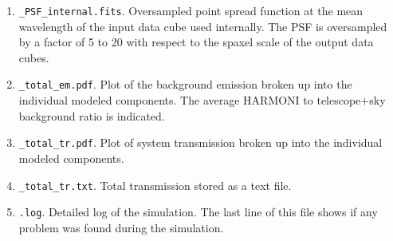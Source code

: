 \documentclass[12pt]{report}
\begin{document}
\begin{enumerate}
\item \texttt{\_PSF\_internal.fits}. Oversampled point spread function at the mean wavelength of the input data cube used internally. The PSF is oversampled by a factor of 5 to 20 with respect to the spaxel scale of the output data cubes.
\item \texttt{\_total\_em.pdf}. Plot of the background emission broken up into the individual modeled components. The average HARMONI to telescope$+$sky background ratio is indicated.
\item \texttt{\_total\_tr.pdf}. Plot of system transmission broken up into the individual modeled components.
\item \texttt{\_total\_tr.txt}. Total transmission stored as a text file.
\item \texttt{.log}. Detailed log of the simulation. The last line of this file shows if any problem was found during the simulation.
\end{enumerate}


% 
% 
% 
% 
% 
% 
% 



\cleardoublepage
{}




\end{document}

